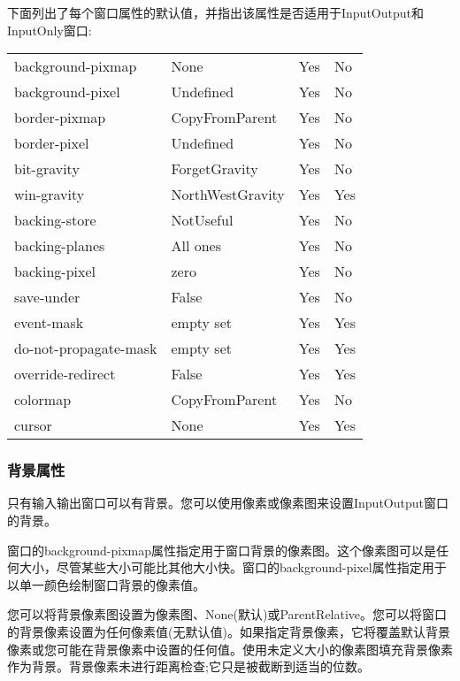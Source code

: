 \noindent 下面列出了每个窗口属性的默认值，并指出该属性是否适用于InputOutput和InputOnly窗口:

\begin{center}
	\begin{supertabular}{|l|l|l|l|}
		background-pixmap & None & Yes & No \\
		background-pixel & Undefined & Yes & No \\
		border-pixmap & CopyFromParent & Yes & No \\
		border-pixel & Undefined & Yes & No \\
		bit-gravity & ForgetGravity & Yes & No \\
		win-gravity & NorthWestGravity & Yes & Yes \\
		backing-store & NotUseful & Yes & No \\
		backing-planes & All ones & Yes & No \\
		backing-pixel & zero & Yes & No \\
		save-under & False & Yes & No \\
		event-mask & empty set & Yes & Yes \\
		do-not-propagate-mask & empty set & Yes & Yes \\
		override-redirect & False & Yes & Yes \\
		colormap & CopyFromParent & Yes & No \\
		cursor & None & Yes & Yes \\
		\hline
	\end{supertabular}
\end{center}

\subsubsection{背景属性}

只有输入输出窗口可以有背景。您可以使用像素或像素图来设置InputOutput窗口的背景。

窗口的background-pixmap属性指定用于窗口背景的像素图。这个像素图可以是任何大小，尽管某些大小可能比其他大小快。窗口的background-pixel属性指定用于以单一颜色绘制窗口背景的像素值。

您可以将背景像素图设置为像素图、None(默认)或ParentRelative。您可以将窗口的背景像素设置为任何像素值(无默认值)。如果指定背景像素，它将覆盖默认背景像素或您可能在背景像素中设置的任何值。使用未定义大小的像素图填充背景像素作为背景。背景像素未进行距离检查;它只是被截断到适当的位数。

